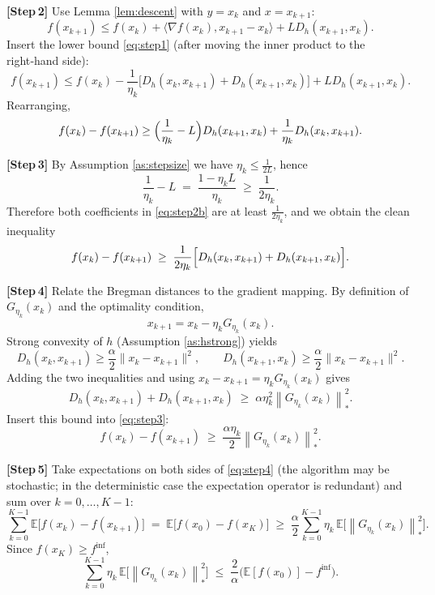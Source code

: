 \documentclass{article}
\newcommand{\E}{\mathbb{E}}
\newcommand{\norm}[1]{\left\|#1\right\|}
\newcommand{\ip}[2]{\langle #1,#2\rangle}
\newcommand{\grad}{\nabla}
\newcommand{\D}{D_{h}}
\begin{document}
\bigskip
\noindent\textbf{[Step 2]} Use Lemma \ref{lem:descent} with $y=x_k$ and $x=x_{k+1}$:
\[
f(x_{k+1})\le f(x_k)+\ip{\grad f(x_k)}{x_{k+1}-x_k}+L\D(x_{k+1},x_k).
\]
Insert the lower bound \eqref{eq:step1} (after moving the inner product to the right‑hand side):
\begin{equation}
\label{eq:step2}
f(x_{k+1})\le f(x_k)-\frac{1}{\eta_k}\bigl[\D(x_k,x_{k+1})+\D(x_{k+1},x_k)\bigr]+L\D(x_{k+1},x_k).
\end{equation}
Rearranging,
\begin{equation}
\label{eq:step2b}
f(x_k)-f(x_{k+1})
\ge
\Bigl(\frac{1}{\eta_k}-L\Bigr)\D(x_{k+1},x_k)+\frac{1}{\eta_k}\D(x_k,x_{k+1}).
\end{equation}

\bigskip
\noindent\textbf{[Step 3]} By Assumption \ref{as:stepsize} we have $\eta_k\le\frac{1}{2L}$, hence
\[
\frac{1}{\eta_k}-L\;=\;\frac{1-\eta_k L}{\eta_k}\;\ge\;\frac{1}{2\eta_k}.
\]
Therefore both coefficients in \eqref{eq:step2b} are at least $\frac{1}{2\eta_k}$, and we obtain the clean inequality
\begin{equation}
\label{eq:step3}
f(x_k)-f(x_{k+1})
\;\ge\;
\frac{1}{2\eta_k}\Bigl[\D(x_k,x_{k+1})+\D(x_{k+1},x_k)\Bigr].
\end{equation}

\bigskip
\noindent\textbf{[Step 4]} Relate the Bregman distances to the gradient mapping. By definition of $G_{\eta_k}(x_k)$ and the optimality condition,
\[
x_{k+1}=x_k-\eta_k G_{\eta_k}(x_k).
\]
Strong convexity of $h$ (Assumption \ref{as:hstrong}) yields
\[
\D(x_k,x_{k+1})\ge\frac{\alpha}{2}\|x_k-x_{k+1}\|^{2},
\qquad
\D(x_{k+1},x_k)\ge\frac{\alpha}{2}\|x_k-x_{k+1}\|^{2}.
\]
Adding the two inequalities and using $x_k-x_{k+1}=\eta_k G_{\eta_k}(x_k)$ gives
\[
\D(x_k,x_{k+1})+\D(x_{k+1},x_k)
\;\ge\;
\alpha\eta_k^{2}\norm{G_{\eta_k}(x_k)}_{*}^{2}.
\]
Insert this bound into \eqref{eq:step3}:
\begin{equation}
\label{eq:step4}
f(x_k)-f(x_{k+1})
\;\ge\;
\frac{\alpha\eta_k}{2}\norm{G_{\eta_k}(x_k)}_{*}^{2}.
\end{equation}

\bigskip
\noindent\textbf{[Step 5]} Take expectations on both sides of \eqref{eq:step4} (the algorithm may be stochastic; in the deterministic case the expectation operator is redundant) and sum over $k=0,\dots,K-1$:
\[
\sum_{k=0}^{K-1}\E\!\bigl[f(x_k)-f(x_{k+1})\bigr]
\;=\;
\E\!\bigl[f(x_0)-f(x_K)\bigr]
\;\ge\;
\frac{\alpha}{2}\sum_{k=0}^{K-1}\eta_k\,\E\!\bigl[\norm{G_{\eta_k}(x_k)}_{*}^{2}\bigr].
\]
Since $f(x_K)\ge f^{\inf}$,
\begin{equation}
\label{eq:step5}
\sum_{k=0}^{K-1}\eta_k\,\E\!\bigl[\norm{G_{\eta_k}(x_k)}_{*}^{2}\bigr]
\;\le\;
\frac{2}{\alpha}\bigl(\E[f(x_0)]-f^{\inf}\bigr).
\end{equation}
\end{document}
